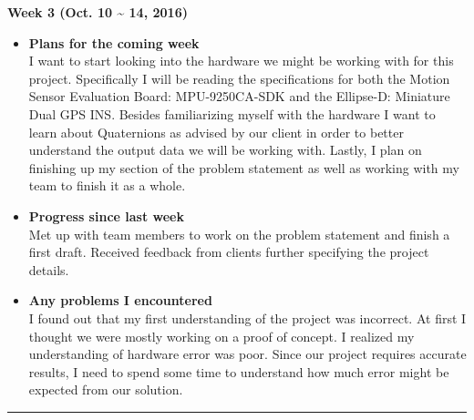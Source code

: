 		\begin{center}
			\textbf{Week 3 (Oct. 10 {\textasciitilde{}} 14, 2016)}
		\end{center}
		\begin{itemize}
			\item \textbf{Plans for the coming week}
			\\ I want to start looking into the hardware we might be working with for this project. Specifically I will be reading the specifications for both the Motion Sensor Evaluation Board: MPU-9250CA-SDK and the Ellipse-D: Miniature Dual GPS INS. Besides familiarizing myself with the hardware I want to learn about Quaternions as advised by our client in order to better understand the output data we will be working with. Lastly, I plan on finishing up my section of the problem statement as well as working with my team to finish it as a whole.\\

			\item \textbf{Progress since last week}
			\\Met up with team members to work on the problem statement and finish a first draft. Received feedback from clients further specifying the project details.\\

			\item \textbf{Any problems I encountered}
			\\I found out that my first understanding of the project was incorrect. At first I thought we were mostly working on a proof of concept. I realized my understanding of hardware error was poor. Since our project requires accurate results, I need to spend some time to understand how much error might be expected from our solution.\\
		\end{itemize}

		\rule{\textwidth}{0.5pt}

